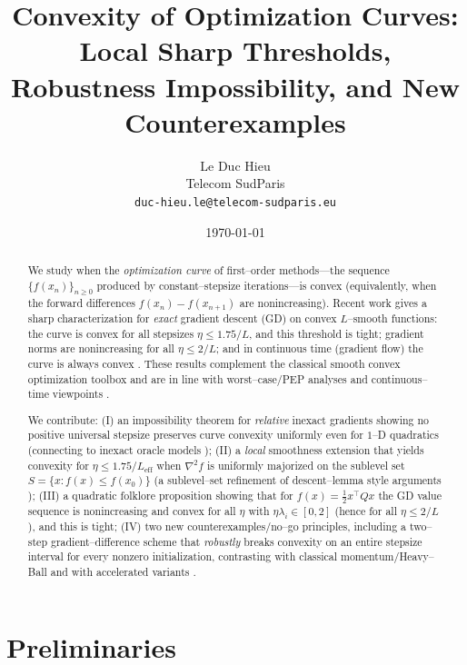 \documentclass[11pt]{article}
\title{Convexity of Optimization Curves: Local Sharp Thresholds,\\
Robustness Impossibility, and New Counterexamples}
\author{Le Duc Hieu\\
\small Telecom SudParis\\
\small \texttt{duc-hieu.le@telecom-sudparis.eu}}
\date{\today}
\theoremstyle{plain}
\theoremstyle{remark}
\begin{document}
\maketitle

\begin{abstract}
We study when the \emph{optimization curve} of first--order methods---the sequence $\{f(x_n)\}_{n\ge0}$ produced by constant--stepsize iterations---is convex (equivalently, when the forward differences $f(x_n)-f(x_{n+1})$ are nonincreasing). Recent work gives a sharp characterization for \emph{exact} gradient descent (GD) on convex $L$--smooth functions: the curve is convex for all stepsizes $\eta\le 1.75/L$, and this threshold is tight; gradient norms are nonincreasing for all $\eta\le 2/L$; and in continuous time (gradient flow) the curve is always convex \cite{BarzilaiShamirZamani2025}. These results complement the classical smooth convex optimization toolbox \cite{Nesterov2004,Bubeck2015,Nesterov2018} and are in line with worst--case/PEP analyses \cite{DroriTeboulle2014,TaylorHendrickxGlineur2017} and continuous--time viewpoints \cite{SuBoydCandes2016,AttouchPeypouquet2016}.

We contribute: (I) an impossibility theorem for \emph{relative} inexact gradients showing no positive universal stepsize preserves curve convexity uniformly even for $1$--D quadratics (connecting to inexact oracle models \cite{DevolderGlineurNesterov2014,DaspremontJaggi2013}); (II) a \emph{local} smoothness extension that yields convexity for $\eta\le 1.75/L_{\mathrm{eff}}$ when $\nabla^2 f$ is uniformly majorized on the sublevel set $S=\{x:f(x)\le f(x_0)\}$ (a sublevel--set refinement of descent--lemma style arguments \cite{Nesterov2004,Bubeck2015}); (III) a quadratic folklore proposition showing that for $f(x)=\tfrac12 x^\top Qx$ the GD value sequence is nonincreasing and convex for all $\eta$ with $\eta\lambda_i\in[0,2]$ (hence for all $\eta\le 2/L$), and this is tight; (IV) two new counterexamples/no--go principles, including a two--step gradient--difference scheme that \emph{robustly} breaks convexity on an entire stepsize interval for every nonzero initialization, contrasting with classical momentum/Heavy--Ball \cite{Polyak1964} and with accelerated variants \cite{Nesterov2013}.
\end{abstract}

\section{Preliminaries}
\end{document}
